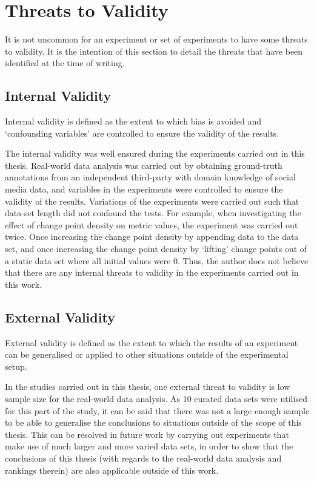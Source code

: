 \documentclass[../main.tex]{subfiles}
\begin{document}
\section{Threats to Validity}
\label{threats}

It is not uncommon for an experiment or set of experiments to have some threats to validity. It is the intention of this section to detail the threats that have been identified at the time of writing.

\subsection{Internal Validity}

Internal validity is defined as the extent to which bias is avoided and `confounding variables' are controlled to ensure the validity of the results.

The internal validity was well ensured during the experiments carried out in this thesis. Real-world data analysis was carried out by obtaining ground-truth annotations from an independent third-party with domain knowledge of social media data, and variables in the experiments were controlled to ensure the validity of the results. Variations of the experiments were carried out such that data-set length did not confound the tests. For example, when investigating the effect of change point density on metric values, the experiment was carried out twice. Once increasing the change point density by appending data to the data set, and once increasing the change point density by `lifting' change points out of a static data set where all initial values were $0$. Thus, the author does not believe that there are any internal threats to validity in the experiments carried out in this work.

\subsection{External Validity}

External validity is defined as the extent to which the results of an experiment can be generalised or applied to other situations outside of the experimental setup.

In the studies carried out in this thesis, one external threat to validity is low sample size for the real-world data analysis. As 10 curated data sets were utilised for this part of the study, it can be said that there was not a large enough sample to be able to generalise the conclusions to situations outside of the scope of this thesis. This can be resolved in future work by carrying out experiments that make use of much larger and more varied data sets, in order to show that the conclusions of this thesis (with regards to the real-world data analysis and rankings therein) are also applicable outside of this work.
\end{document}
